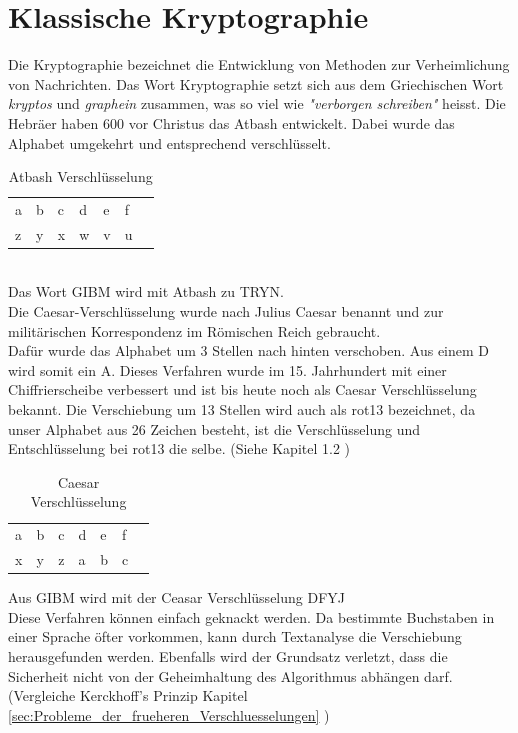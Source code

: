 \section{Klassische Kryptographie}
Die Kryptographie bezeichnet die Entwicklung von Methoden zur Verheimlichung von Nachrichten. Das Wort Kryptographie setzt sich aus dem Griechischen Wort \textit{kryptos} und \textit{graphein} zusammen, was so viel wie \textit{"verborgen schreiben"} heisst.%
Die Hebräer haben 600 vor Christus das Atbash entwickelt. Dabei wurde das Alphabet umgekehrt und entsprechend verschlüsselt.
%
\begin{table}[ht]
\caption{Atbash Verschlüsselung}
\begin{center}
\begin{tabular}{|l|l|l|l|l|l|l|}
  a & b & c & d & e & f\\
  z & y & x & w & v & u\\
\end{tabular}
\end{center}
\end{table} \\
%
Das Wort GIBM wird mit Atbash zu TRYN.\\
Die Caesar-Verschlüsselung wurde nach Julius Caesar benannt und zur militärischen Korrespondenz im Römischen Reich gebraucht.\\
Dafür wurde das Alphabet um 3 Stellen nach hinten verschoben. Aus einem D wird somit ein A. Dieses Verfahren wurde im 15. Jahrhundert mit einer Chiffrierscheibe verbessert und ist bis heute noch als Caesar Verschlüsselung bekannt. Die Verschiebung um 13 Stellen wird auch als rot13 bezeichnet, da unser Alphabet aus 26 Zeichen besteht, ist die Verschlüsselung und Entschlüsselung bei rot13 die selbe. (Siehe Kapitel 1.2 \cite{kryptographie_Grundlagen} ) \\
%
\begin{table}[ht]
\caption{Caesar Verschlüsselung}
\begin{center}
\begin{tabular}{|l|l|l|l|l|l|l|}
  a & b & c & d & e & f\\
  x & y & z & a & b & c\\
\end{tabular}
\end{center}
\end{table}
%
Aus GIBM wird mit der Ceasar Verschlüsselung DFYJ \\
%
Diese Verfahren können einfach geknackt werden. Da bestimmte Buchstaben in einer Sprache öfter vorkommen, kann durch Textanalyse die Verschiebung herausgefunden werden. Ebenfalls wird der Grundsatz verletzt, dass die Sicherheit nicht von der Geheimhaltung des Algorithmus abhängen darf. (Vergleiche Kerckhoff's Prinzip Kapitel \ref{sec:Probleme_der_frueheren_Verschluesselungen} )
%
%
